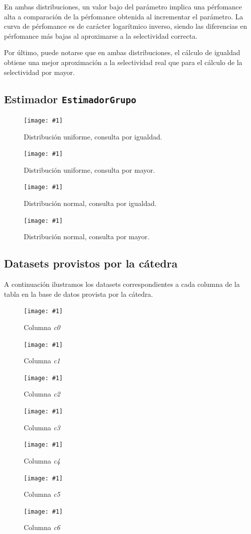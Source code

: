 \documentclass[a4paper, 10pt, twoside]{article}
\newcommand{\grafico}[3]{
  \begin{figure}[H]
    \texttt{[image: \#1]}
    \caption{#2}
    \label{#3}
  \end{figure}
}
\begin{document}
En ambas distribuciones, un valor bajo del parámetro implica una pérfomance alta a comparación de la pérfomance obtenida al 
incrementar el parámetro. La curva de pérfomance es de carácter logarítmico inverso, siendo las diferencias en pérfomance más bajas
al aproximarse a la selectividad correcta.

Por último, puede notarse que en ambas distribuciones, el cálculo de igualdad obtiene una mejor aproximación a la selectividad real 
que para el cálculo de la selectividad por mayor.

\subsection{Estimador \texttt{EstimadorGrupo}}

\grafico{plot-custom-uniform-equal}
        {Distribución uniforme, consulta por igualdad.}
        {plot-custom-uniform-equal}
\grafico{plot-custom-uniform-greater}
        {Distribución uniforme, consulta por mayor.}
        {plot-custom-uniform-greater}
\grafico{plot-custom-normal-equal}
        {Distribución normal, consulta por igualdad.}
        {plot-custom-normal-equal}
\grafico{plot-custom-normal-greater}
        {Distribución normal, consulta por mayor.}
        {plot-custom-normal-greater}


\subsection{Datasets provistos por la cátedra}

A continuación ilustramos los datasets correspondientes a cada columna de la tabla en la base de datos provista por la cátedra.

\grafico{dataset-c0}
        {Columna \emph{c0}}
        {dataset-columna-c0}

\grafico{dataset-c1}
        {Columna \emph{c1}}
        {dataset-columna-c1}

\grafico{dataset-c2}
        {Columna \emph{c2}}
        {dataset-columna-c2}

\grafico{dataset-c3}
        {Columna \emph{c3}}
        {dataset-columna-c3}

\grafico{dataset-c4}
        {Columna \emph{c4}}
        {dataset-columna-c4}

\grafico{dataset-c5}
        {Columna \emph{c5}}
        {dataset-columna-c5}

\grafico{dataset-c6}
        {Columna \emph{c6}}
        {dataset-columna-c6}
\end{document}
